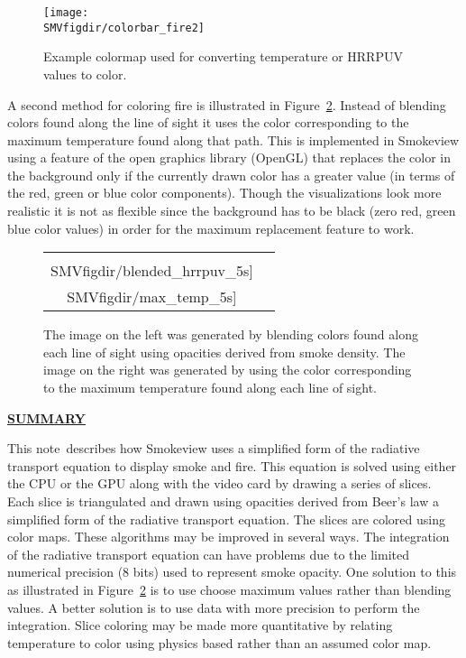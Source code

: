 \documentclass[11pt]{article}
\newcommand{\paper}{note}
\newcommand{\SMVfigdir}{../../../fig/smv/figures}
\newcommand{\ssection}[1]{\underline{\bf #1}}
\begin{document}
\begin{figure}[bph]
\begin{center}
\texttt{[image: \\SMVfigdir/colorbar\_fire2]}
\end{center}
\caption{Example colormap used for converting temperature or HRRPUV values to color.}
\label{fig:colormaps}
\end{figure}

A second method for coloring fire is illustrated in Figure~\ref{fig:blendedmaximages}.
Instead of blending colors found along the line of sight it uses the color corresponding to the maximum temperature found along that path. This is implemented in Smokeview using a feature of the open graphics library
(OpenGL)\cite{OpenGLRed}
that replaces the color in the background only if the currently drawn color has a greater value (in terms of the red, green or blue color components).  Though the visualizations look more realistic it is not as flexible since the background has to be black (zero red, green blue color values) in order for the maximum replacement feature to work.

\begin{figure}[bph]
\begin{center}
\begin{tabular}{cc}
\texttt{[image: \\SMVfigdir/blended\_hrrpuv\_5s]}&
\texttt{[image: \\SMVfigdir/max\_temp\_5s]}
\end{tabular}
\end{center}
\caption{The image on the left was generated by blending colors found along each line of sight using opacities derived from smoke density.  The image on the right was generated by using the color corresponding
to the maximum temperature found along each line of sight.}
\label{fig:blendedmaximages}
\end{figure}



\ssection{SUMMARY}

This \paper\ describes how Smokeview uses a simplified form of the radiative transport equation to display
smoke and fire.
This equation is solved using either the CPU or the GPU along with the video card by drawing a series of slices.
Each slice is triangulated and drawn using opacities derived from Beer's law a simplified form of the
radiative transport equation. The slices are colored using color maps. 
These algorithms
may be improved in several ways. The integration of the radiative transport equation can have problems
due to the limited numerical precision (8 bits) used to represent smoke opacity.
One solution to this as illustrated in Figure~\ref{fig:blendedmaximages} is to use
choose maximum values rather than blending values.  A better solution is to use data with
more precision to perform the integration. Slice coloring may be made more quantitative by
relating temperature to color using physics based rather than an assumed
color map. 



\end{document}
